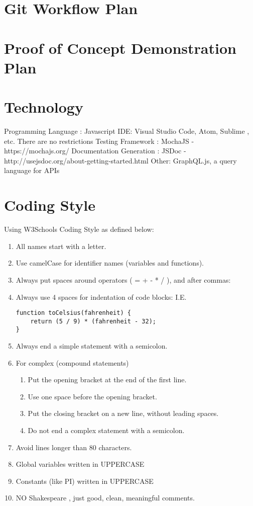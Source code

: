 \documentclass{article}
\begin{document}
\section{Git Workflow Plan}
\section{Proof of Concept Demonstration Plan}
\section{Technology}

Programming Language : Javascript \newline
IDE:  Visual Studio Code, Atom, Sublime , etc. There are no restrictions\newline 
Testing Framework : MochaJS  - https://mochajs.org/ \newline
Documentation Generation : JSDoc - http://usejsdoc.org/about-getting-started.html \newline 
Other: GraphQL.js, a query language for APIs\newline

\section{Coding Style}

Using W3Schools Coding Style as defined below:
\begin{enumerate}
\item All names start with a letter.
\item Use camelCase for identifier names (variables and functions).
\item Always put spaces around operators ( = + - * / ), and after commas:
\item Always use 4 spaces for indentation of code blocks: I.E.
\begin{lstlisting} 
function toCelsius(fahrenheit) {
    return (5 / 9) * (fahrenheit - 32);
}
\end{lstlisting}
\item Always end a simple statement with a semicolon.
\item For complex (compound statements)
\begin{enumerate}
\item Put the opening bracket at the end of the first line.
\item  Use one space before the opening bracket.
\item  Put the closing bracket on a new line, without leading spaces.
\item  Do not end a complex statement with a semicolon.
\end{enumerate}
\item Avoid lines longer than 80 characters.
\item Global variables written in UPPERCASE 
\item Constants (like PI) written in UPPERCASE
\item NO Shakespeare , just good, clean, meaningful comments.
\end{enumerate}
\end{document}
